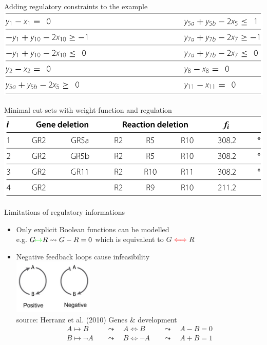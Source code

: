 \documentclass{beamer}
\begin{document}
\begin{frame}{Adding regulatory constraints to the example}
    \includegraphics[width=1\textwidth]{grafik/table4} \\
\end{frame}

\begin{frame}{Minimal cut sets with weight-function and regulation}
    \includegraphics[width=1\textwidth]{grafik/table5}    
\end{frame}

\begin{frame}{Limitations of regulatory informations}
\begin{itemize}
    \item Only explicit Boolean functions can be modelled \\
    e.g. $G \textcolor{green}{\mapsto} R \leadsto G -R = 0$ 
    which is equivalent to  $G  \textcolor{red}{\iff} R$
    \item Negative feedback loops cause infeasibility \\
        \includegraphics[width=0.3\textwidth]{grafik/feedbackloop} \\
        \tiny{source: Herranz et al. (2010) Genes \& development} \\
        \normalsize
\begin{align*}
    A \mapsto B        & \quad \leadsto \quad A \iff B       & \quad \leadsto \quad A - B = 0 \\
    B \mapsto \neg A   &  \quad \leadsto \quad  B \iff \neg A & \quad \leadsto \quad A + B = 1  \\
\end{align*}

\end{itemize}
\end{frame}
\end{document}
